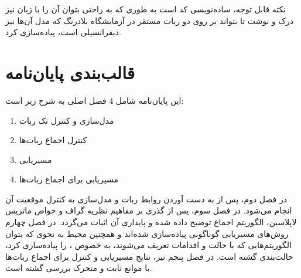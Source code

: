 نکته قابل توجه، ساده‌نویسی کد است به طوری که به راحتی بتوان آن را با زبان  نیز درک و نوشت تا بتواند بر روی دو ربات مستقر در آزمایشگاه بلادرنگ که مدل آن‌ها نیز دیفرانسیلی است، پیاده‌سازی کرد.

\section{قالب‌بندی پایان‌نامه}
این پایان‌نامه شامل 4 فصل اصلی به شرح زیر است:
\begin{enumerate}
	\item مدل‌سازی و کنترل تک ربات
	\item کنترل اجماع ربات‌ها
	\item مسیریابی
	\item مسیریابی برای اجماع ربات‌ها
\end{enumerate}

در فصل دوم، پس از به دست آوردن روابط ربات و مدل‌سازی به کنترل موقعیت آن انجام می‌شود. در فصل سوم، پس از گذری بر مفاهیم نظریه گراف و خواص ماتریس لاپلاسین،  الگوریتم اجماع توضیح داده شده و پایداری آن اثبات می‌گردد. در فصل چهارم روش‌های مسیریابی گوناگونی پیاده‌سازی شده‌اند و همچنین محیط به نحوی که بتوان الگوریتم‌هایی که با حالت و اقدامات تعریف می‌شوند، به خصوص ، را پیاده‌سازی کرد، حالت‌بندی گشته است. در فصل پنجم نیز، نتایج مسیریابی و کنترل برای اجماع ربات‌ها با موانع ثابت و متحرک بررسی گشته است.



















